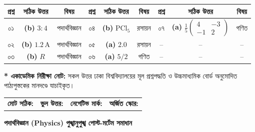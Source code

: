 \documentclass[11pt,oneside]{scrbook}
\newenvironment{subjectbanner}[1]{%
    \begin{tcolorbox}[colback=VarsityBlue!10, colframe=VarsityBlue, arc=4pt, boxrule=1.2pt,
        halign=center, top=6pt, bottom=6pt, after=\vspace{8pt}]
    {\large\bfseries\color{VarsityBlue}#1}%
}{%
    \end{tcolorbox}%
}
\begin{document}
\begin{matrixbox}
\centering
\begin{tabularx}{\textwidth}{||c|c|c||c|c|c||c|c|c||}
\hline
\rowcolor{VarsityBlue!15}
\textbf{প্রশ্ন} & \textbf{সঠিক উত্তর} & \textbf{বিষয়} & \textbf{প্রশ্ন} & \textbf{সঠিক উত্তর} & \textbf{বিষয়} & \textbf{প্রশ্ন} & \textbf{সঠিক উত্তর} & \textbf{বিষয়} \\
\hline
০১ & \textbf{(b)} $3:4$ & পদার্থবিজ্ঞান & ০৪ & \textbf{(b)} $\text{PCl}_5$ & রসায়ন & ০৭ & \textbf{(a)} $\frac{1}{5}\begin{pmatrix} 4 & -3 \\ -1 & 2 \end{pmatrix}$ & গণিত \\
\hline
০২ & \textbf{(b)} $1.2\,\text{A}$ & পদার্থবিজ্ঞান & ০৫ & \textbf{(a)} $2.0$ & রসায়ন & -- & -- & -- \\
\hline
০৩ & \textbf{(b)} $R$ & পদার্থবিজ্ঞান & ০৬ & \textbf{(a)} $5/2$ & গণিত & -- & -- & -- \\
\hline
\end{tabularx}

\vspace{8pt}
\begin{tcolorbox}[colback=LightGray, colframe=HiveGold, boxrule=0.8pt, arc=3pt, top=4pt, bottom=4pt]
    \footnotesize\textbf{* একাডেমিক নিরীক্ষা নোট:} সকল উত্তর ঢাকা বিশ্ববিদ্যালয়ের মূল প্রশ্নপদ্ধতি ও উচ্চমাধ্যমিক বোর্ড অনুমোদিত পাঠ্যপুস্তকের মানদণ্ডে যাচাইকৃত। 
\end{tcolorbox}

\vspace{4pt}
\begin{tabularx}{\textwidth}{XXXX}
    \textbf{মোট সঠিক:} \underline{\hspace{1.5cm}} & \textbf{ভুল উত্তর:} \underline{\hspace{1.5cm}} & \textbf{নেগেটিভ মার্ক:} \underline{\hspace{1.5cm}} & \textbf{অর্জিত স্কোর:} \underline{\hspace{1.8cm}}
\end{tabularx}
\end{matrixbox}

\newpage


\begin{subjectbanner}{পদার্থবিজ্ঞান (Physics) \textbar{} পুঙ্খানুপুঙ্খ পোস্ট-মর্টেম সমাধান}
\end{subjectbanner}
\end{document}
